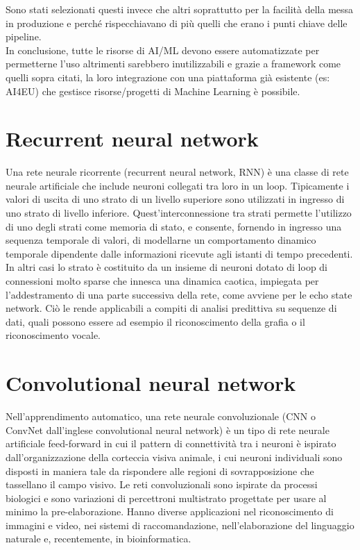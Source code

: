 \documentclass[12pt,a4paper]{report}
\begin{document}
Sono stati selezionati questi invece che altri soprattutto per la facilità della messa in produzione e perché rispecchiavano di più quelli che erano i punti chiave delle pipeline.\\
In conclusione, tutte le risorse di AI/ML devono essere automatizzate per permetterne l'uso altrimenti sarebbero inutilizzabili e grazie a framework come quelli sopra citati, la loro integrazione con una piattaforma già esistente (es: AI4EU) che gestisce risorse/progetti di Machine Learning è possibile.

\begin{appendices}
\section{Recurrent neural network}
\label{appendix:RNN}
Una rete neurale ricorrente (recurrent neural network, RNN) è una classe di rete neurale artificiale che include neuroni collegati tra loro in un loop. Tipicamente i valori di uscita di uno strato di un livello superiore sono utilizzati in ingresso di uno strato di livello inferiore. Quest'interconnessione tra strati permette l'utilizzo di uno degli strati come memoria di stato, e consente, fornendo in ingresso una sequenza temporale di valori, di modellarne un comportamento dinamico temporale dipendente dalle informazioni ricevute agli istanti di tempo precedenti. In altri casi lo strato è costituito da un insieme di neuroni dotato di loop di connessioni molto sparse che innesca una dinamica caotica, impiegata per l'addestramento di una parte successiva della rete, come avviene per le echo state network. Ciò le rende applicabili a compiti di analisi predittiva su sequenze di dati, quali possono essere ad esempio il riconoscimento della grafia o il riconoscimento vocale. \cite{itwiki:120617040}

\section{Convolutional neural network}
\label{appendix:CNN}
Nell'apprendimento automatico, una rete neurale convoluzionale (CNN o ConvNet dall'inglese convolutional neural network) è un tipo di rete neurale artificiale feed-forward in cui il pattern di connettività tra i neuroni è ispirato dall'organizzazione della corteccia visiva animale, i cui neuroni individuali sono disposti in maniera tale da rispondere alle regioni di sovrapposizione che tassellano il campo visivo. Le reti convoluzionali sono ispirate da processi biologici e sono variazioni di percettroni multistrato progettate per usare al minimo la pre-elaborazione. Hanno diverse applicazioni nel riconoscimento di immagini e video, nei sistemi di raccomandazione, nell'elaborazione del linguaggio naturale e, recentemente, in bioinformatica. \cite{itwiki:122354896}
    

\end{appendices}
\end{document}
